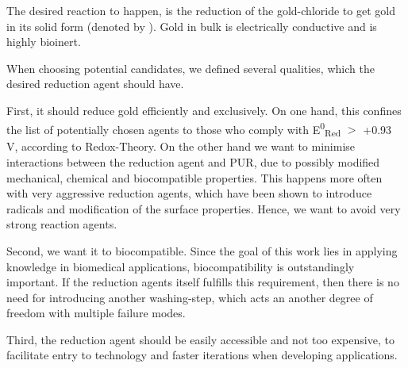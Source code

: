 The desired reaction to happen, is the reduction of the gold-chloride to get gold in its solid form (denoted by ). Gold in bulk is electrically conductive and is highly bioinert.

When choosing potential candidates, we defined several qualities, which the desired reduction agent should have.

First, it should reduce gold efficiently and exclusively. On one hand, this confines the list of potentially chosen agents to those who comply with E\textsuperscript{0}\textsubscript{Red} $\mathrm{>}$ +0.93 V, according to Redox-Theory. On the other hand we want to minimise interactions between the reduction agent and PUR, due to possibly modified mechanical, chemical and biocompatible properties. This happens more often with very aggressive reduction agents, which have been shown to introduce radicals and modification of the surface properties. Hence, we want to avoid very strong reaction agents. 

Second, we want it to biocompatible. Since the goal of this work lies in applying knowledge in biomedical applications, biocompatibility is outstandingly important. If the reduction agents itself fulfills this requirement, then there is no need for introducing another washing-step, which acts an another degree of freedom with multiple failure modes.


Third, the reduction agent should be easily accessible and not too expensive, to facilitate entry to technology and faster iterations when developing applications.


